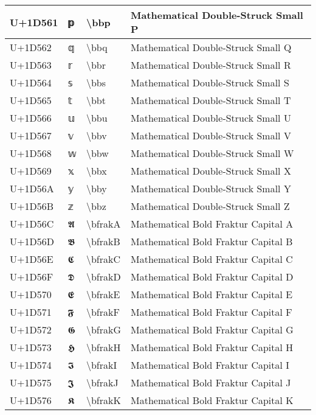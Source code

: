 \begin{table}[h]
\begin{tabulary}{\linewidth}{|L|L|L|L|}
\hline
U+1D561 & 𝕡 & {\textbackslash}bbp & Mathematical Double-Struck Small P \\
\hline
U+1D562 & 𝕢 & {\textbackslash}bbq & Mathematical Double-Struck Small Q \\
\hline
U+1D563 & 𝕣 & {\textbackslash}bbr & Mathematical Double-Struck Small R \\
\hline
U+1D564 & 𝕤 & {\textbackslash}bbs & Mathematical Double-Struck Small S \\
\hline
U+1D565 & 𝕥 & {\textbackslash}bbt & Mathematical Double-Struck Small T \\
\hline
U+1D566 & 𝕦 & {\textbackslash}bbu & Mathematical Double-Struck Small U \\
\hline
U+1D567 & 𝕧 & {\textbackslash}bbv & Mathematical Double-Struck Small V \\
\hline
U+1D568 & 𝕨 & {\textbackslash}bbw & Mathematical Double-Struck Small W \\
\hline
U+1D569 & 𝕩 & {\textbackslash}bbx & Mathematical Double-Struck Small X \\
\hline
U+1D56A & 𝕪 & {\textbackslash}bby & Mathematical Double-Struck Small Y \\
\hline
U+1D56B & 𝕫 & {\textbackslash}bbz & Mathematical Double-Struck Small Z \\
\hline
U+1D56C & 𝕬 & {\textbackslash}bfrakA & Mathematical Bold Fraktur Capital A \\
\hline
U+1D56D & 𝕭 & {\textbackslash}bfrakB & Mathematical Bold Fraktur Capital B \\
\hline
U+1D56E & 𝕮 & {\textbackslash}bfrakC & Mathematical Bold Fraktur Capital C \\
\hline
U+1D56F & 𝕯 & {\textbackslash}bfrakD & Mathematical Bold Fraktur Capital D \\
\hline
U+1D570 & 𝕰 & {\textbackslash}bfrakE & Mathematical Bold Fraktur Capital E \\
\hline
U+1D571 & 𝕱 & {\textbackslash}bfrakF & Mathematical Bold Fraktur Capital F \\
\hline
U+1D572 & 𝕲 & {\textbackslash}bfrakG & Mathematical Bold Fraktur Capital G \\
\hline
U+1D573 & 𝕳 & {\textbackslash}bfrakH & Mathematical Bold Fraktur Capital H \\
\hline
U+1D574 & 𝕴 & {\textbackslash}bfrakI & Mathematical Bold Fraktur Capital I \\
\hline
U+1D575 & 𝕵 & {\textbackslash}bfrakJ & Mathematical Bold Fraktur Capital J \\
\hline
U+1D576 & 𝕶 & {\textbackslash}bfrakK & Mathematical Bold Fraktur Capital K \\

\end{tabulary}
\end{table}
